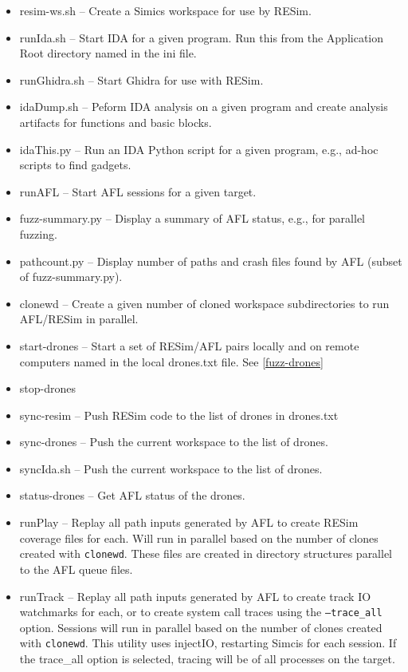 \documentclass[titlepage]{article}
\begin{document}
\begin{itemize}
\item resim-ws.sh -- Create a Simics workspace for use by RESim.
\item runIda.sh -- Start IDA for a given program.  Run this from the Application Root directory named in the ini file.
\item runGhidra.sh -- Start Ghidra for use with RESim.
\item idaDump.sh -- Peform IDA analysis on a given program and create analysis artifacts for functions and basic blocks.
\item idaThis.py -- Run an IDA Python script for a given program, e.g., ad-hoc scripts to find gadgets.
\item runAFL -- Start AFL sessions for a given target.
\item fuzz-summary.py -- Display a summary of AFL status, e.g., for parallel fuzzing.
\item pathcount.py -- Display number of paths and crash files found by AFL (subset of fuzz-summary.py).
\item clonewd -- Create a given number of cloned workspace subdirectories to run AFL/RESim in parallel.
\item start-drones -- Start a set of RESim/AFL pairs locally and on remote computers named in the local drones.txt file. See \ref{fuzz-drones}
\item stop-drones
\item sync-resim -- Push RESim code to the list of drones in drones.txt
\item sync-drones -- Push the current workspace to the list of drones.
\item syncIda.sh -- Push the current workspace to the list of drones.
\item status-drones -- Get AFL status of the drones.
\item runPlay -- Replay all path inputs generated by AFL to create RESim coverage files for each.  Will run in parallel based on the number of clones created with {\tt clonewd}.
These files are created in directory structures parallel to the AFL queue files.
\item runTrack -- Replay all path inputs generated by AFL to create track IO watchmarks for each, or to create system call traces using the {\tt --trace\_all} option.  
Sessions will run in parallel based on the number of clones created with {\tt clonewd}.  This utility uses injectIO, restarting Simcis for each session.  If the trace\_all option
is selected, tracing will be of all processes on the target.

\end{itemize}
\end{document}
